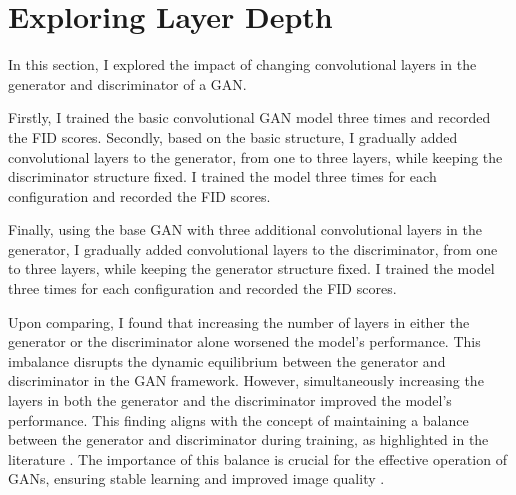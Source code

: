 \section{Exploring Layer Depth}

In this section, I explored the impact of changing convolutional layers in the generator and discriminator of a GAN.

Firstly, I trained the basic convolutional GAN model three times and recorded the FID scores. Secondly, based on the basic structure, I gradually added convolutional layers to the generator, from one to three layers, while keeping the discriminator structure fixed. I trained the model three times for each configuration and recorded the FID scores.

Finally, using the base GAN with three additional convolutional layers in the generator, I gradually added convolutional layers to the discriminator, from one to three layers, while keeping the generator structure fixed. I trained the model three times for each configuration and recorded the FID scores.

Upon comparing, I found that increasing the number of layers in either the generator or the discriminator alone worsened the model’s performance. This imbalance disrupts the dynamic equilibrium between the generator and discriminator in the GAN framework. However, simultaneously increasing the layers in both the generator and the discriminator improved the model’s performance. This finding aligns with the concept of maintaining a balance between the generator and discriminator during training, as highlighted in the literature \citep{10.48550/arxiv.1703.10717}. The importance of this balance is crucial for the effective operation of GANs, ensuring stable learning and improved image quality \citep{10.48550/arxiv.2002.02112}.    

